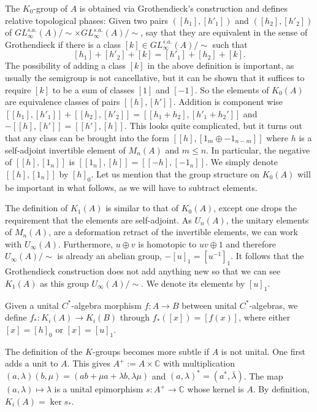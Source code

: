 \documentclass[11pt]{amsart}
\newcommand{\C}{\mathbb{C}}
\begin{document}
The $K_0$-group of $A$ is obtained via Grothendieck's construction and defines relative topological phases: Given two pairs $([h_1],[h'_1])$ and 
$([h_2],[h'_2])$ of $GL_\infty^{s.a.}(A)/\sim\times GL_\infty^{s.a.}(A)/\sim$, say that they are equivalent in the sense of Grothendieck if there is a class $[k]\in GL_\infty^{s.a.}(A)/\sim$ such that
$$[h_1]+[h'_2] + [k] = [h'_1]+[h_2] + [k].$$
The possibility of adding a class $[k]$ in the above definition is important, as usually the semigroup is not cancellative, but it can be shown that it suffices to require $[k]$ to be a sum of classes $[1]$ and $[-1]$.
So the elements of $K_0(A)$ are equivalence classes of pairs $[[h],[h']]$. 
Addition is component wise $[[h_1],[h'_1]]+[[h_2],[h'_2]] = [[h_1+h_2],[h'_1+h_2']]$ and $-[[h],[h']]=[[h'],[h]]$.
This looks quite complicated, but it turns out that any class can be brought into the form $[[h],[1_m\oplus -1_{n-m}]]$ where $h$ is a self-adjoint invertible element of $M_n(A)$ and $m\leq n$. In particular, the negative of $[[h],[1_n]]$ is 
$[[1_n],[h]] = [[-h],[-1_n]]$. 
We simply denote $[[h],[1_n]]$ by $[h]_0$.  Let us mention that the group structure on $K_0(A)$ will be important in what follows, as we will have to subtract elements. 

The definition of $K_1(A)$ is similar to that of $K_0(A)$, except one drops the requirement that the elements are self-adjoint. As $U_n(A)$, the unitary elements of $M_n(A)$,  are a deformation retract of the invertible elements, we can work with $U_\infty(A)$.
Furthermore, $u\oplus v$ is homotopic to $uv\oplus 1$ and therefore $U_\infty(A)/\sim$ is already an abelian group, $-[u]_1 = [u^{-1}]_1$. It follows that the Grothendieck construction does not add anything new so that we can see $K_1(A)$ as this  group $U_\infty(A)/\sim$. We denote its elements by $[u]_1$. 

Given a unital $C^*$-algebra morphism $f:A\to B$ between unital $C^*$-algebras, we define $f_*:K_i(A)\to K_i(B)$ through $f_*([x]) = [f(x)]$, where either $[x] = [h]_0$ or $[x]=[u]_1$. 

The definition of the $K$-groups becomes more subtle if $A$ is not unital. One first adds a unit to $A$. This gives $A^+:= A\times\C$ with multiplication $(a,\lambda)(b,\mu) = (ab+\mu a+\lambda b,\lambda\mu)$ and  $(a,\lambda)^* =  (a^*,\bar \lambda)$. The map $(a,\lambda)\mapsto \lambda$ is a unital epimorphism $s:A^+\to \C$ whose kernel is $A$. By definition, $K_i(A) = \ker s_*$. 
\end{document}
